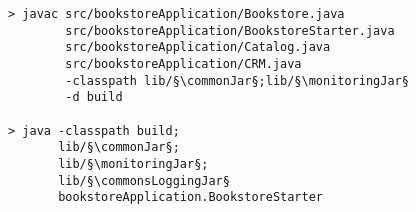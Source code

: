 \begin{lstlisting}[caption=Compile and run under Windows]
> javac src/bookstoreApplication/Bookstore.java 
        src/bookstoreApplication/BookstoreStarter.java 
        src/bookstoreApplication/Catalog.java 
        src/bookstoreApplication/CRM.java 
        -classpath lib/§\commonJar§;lib/§\monitoringJar§
        -d build

> java -classpath build;
       lib/§\commonJar§;
       lib/§\monitoringJar§;
       lib/§\commonsLoggingJar§
       bookstoreApplication.BookstoreStarter 
\end{lstlisting}
